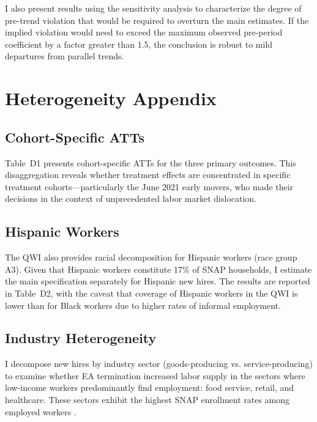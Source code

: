 \documentclass[12pt]{article}
\begin{document}
I also present results using the \citet{rambachan2023more} sensitivity analysis to characterize the degree of pre-trend violation that would be required to overturn the main estimates. If the implied violation would need to exceed the maximum observed pre-period coefficient by a factor greater than 1.5, the conclusion is robust to mild departures from parallel trends.

\section{Heterogeneity Appendix}
\label{sec:heterogeneity}

\subsection{Cohort-Specific ATTs}


Table~D1 presents cohort-specific ATTs for the three primary outcomes. This disaggregation reveals whether treatment effects are concentrated in specific treatment cohorts---particularly the June 2021 early movers, who made their decisions in the context of unprecedented labor market dislocation.

\subsection{Hispanic Workers}

The QWI also provides racial decomposition for Hispanic workers (race group A3). Given that Hispanic workers constitute 17\% of SNAP households, I estimate the main specification separately for Hispanic new hires. The results are reported in Table~D2, with the caveat that coverage of Hispanic workers in the QWI is lower than for Black workers due to higher rates of informal employment.

\subsection{Industry Heterogeneity}

I decompose new hires by industry sector (goods-producing vs. service-producing) to examine whether EA termination increased labor supply in the sectors where low-income workers predominantly find employment: food service, retail, and healthcare. These sectors exhibit the highest SNAP enrollment rates among employed workers .
\end{document}
